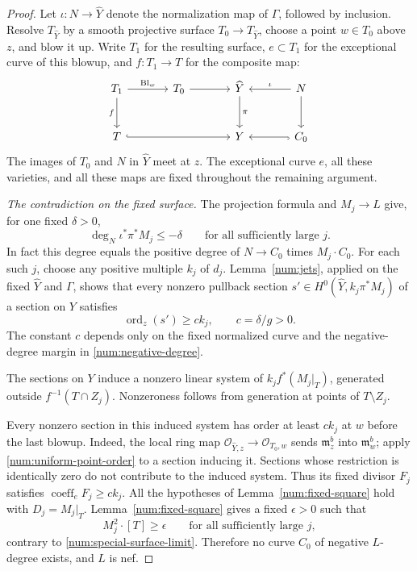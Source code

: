 \begin{proof}
Let \(\iota:N\to\widehat Y\) denote the normalization map of
\(\Gamma\), followed by inclusion.
Resolve \(T_{\widehat Y}\) by a smooth projective surface
\(T_0\to T_{\widehat Y}\), choose a point \(w\in T_0\)
above \(z\), and blow it up.  Write \(T_1\) for the resulting
surface, \(e\subset T_1\) for the exceptional curve of this
blowup, and \(f:T_1\to T\) for the composite map:
\[
\begin{tikzcd}[column sep=large,row sep=large]
 T_1 \arrow[r,"\mathrm{Bl}_w"] \arrow[d,"f"'] &
 T_0 \arrow[r] &
 \widehat Y \arrow[d,"\pi"] &
 N \arrow[l,"\iota"'] \arrow[d] \\
 T \arrow[rr,hook] & & Y & C_0 \arrow[l,hook]
\end{tikzcd}
\]
The images of \(T_0\) and \(N\) in \(\widehat Y\) meet at
\(z\).  The exceptional curve \(e\), all these varieties, and
all these maps are fixed throughout the remaining argument.

\smallskip\noindent
\emph{The contradiction on the fixed surface.}
The projection formula and \(M_j\to L\) give, for one fixed
\(\delta>0\),
\begin{equation}\label{num:negative-degree}
\deg_N\iota^*\pi^*M_j\leq-\delta
\qquad\text{for all sufficiently large }j.
\end{equation}
In fact this degree equals the positive degree of
\(N\to C_0\) times \(M_j\cdot C_0\).
For each such \(j\), choose any positive multiple \(k_j\) of
\(d_j\).  Lemma~\ref{num:jets}, applied on the fixed
\(\widehat Y\) and \(\Gamma\), shows that every nonzero
pullback section
\(s'\in H^0(\widehat Y,k_j\pi^*M_j)\) of a section on \(Y\)
satisfies
\begin{equation}\label{num:uniform-point-order}
\operatorname{ord}_z(s')\geq ck_j,
\qquad c=\delta/g>0.
\end{equation}
The constant \(c\) depends only on the fixed normalized curve and
the negative-degree margin in \eqref{num:negative-degree}.

The sections on \(Y\) induce a nonzero linear system of
\(k_jf^*(M_j|_T)\), generated outside
\(f^{-1}(T\cap Z_j)\).  Nonzeroness follows from generation
at points of \(T\setminus Z_j\).

Every nonzero section in this induced system has order at least
\(ck_j\) at \(w\) before the last blowup.  Indeed, the local
ring map
\(\mathcal O_{\widehat Y,z}\to\mathcal O_{T_0,w}\)
sends \(\mathfrak m_z^b\) into \(\mathfrak m_w^b\);
apply \eqref{num:uniform-point-order} to a section inducing it.
Sections whose restriction is identically zero do not contribute
to the induced system.  Thus its fixed divisor \(F_j\) satisfies
\(\operatorname{coeff}_eF_j\geq ck_j\).
All the hypotheses of Lemma~\ref{num:fixed-square} hold with
\(D_j=M_j|_T\).  Lemma~\ref{num:fixed-square} gives a fixed \(\epsilon>0\) such
that
\[
M_j^2\cdot[T]\geq\epsilon
\qquad\text{for all sufficiently large }j,
\]
contrary to \eqref{num:special-surface-limit}.  Therefore no
curve \(C_0\) of negative \(L\)-degree exists, and \(L\) is nef.
\end{proof}
